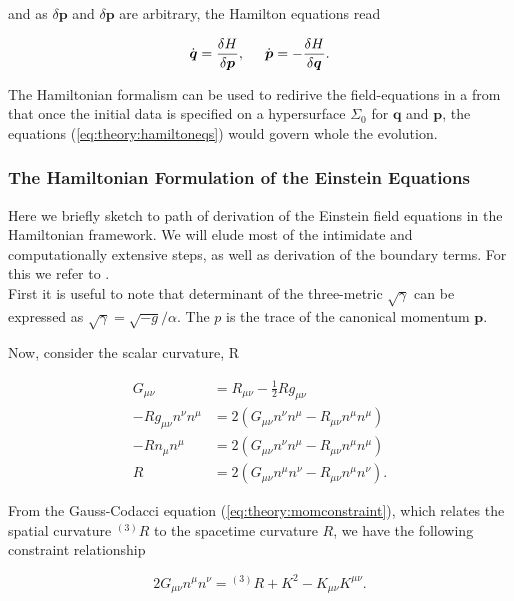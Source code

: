 \documentclass[11pt,a4paper,headinclude=true,DIV=14,BCOR=8mm,chapterprefix,listof=totoc,twoside,openright,abstracton]{scrbook}
\begin{document}
and as $\delta\boldsymbol{p}$ and $\delta\boldsymbol{p}$ are arbitrary, the Hamilton equations read

\begin{equation}
    \dot{\boldsymbol{q}}=\frac{\delta H}{\delta\boldsymbol{p}}, \hspace{5mm} \dot{\boldsymbol{p}} = -\frac{\delta H}{\delta\boldsymbol{q}}.
    \label{eq:theory:hamiltoneqs}
\end{equation}

The Hamiltonian formalism can be used to redirive the field-equations in a from that once the initial data is specified on a hypersurface $\Sigma_0$ for $\boldsymbol{q}$ and $\boldsymbol{p}$, the equations (\ref{eq:theory:hamiltoneqs}) would govern whole the evolution.

\subsubsection{The Hamiltonian Formulation of the Einstein Equations}

Here we briefly sketch to path of derivation of the Einstein field equations in the Hamiltonian framework. We will elude most of the intimidate and computationally extensive steps, as well as derivation of the boundary terms. For this we refer to \cite{Poisson:2004}.\\
First it is useful to note that determinant of the three-metric $\sqrt{\gamma}$ can be expressed as $\sqrt{\gamma}=\sqrt{-g}/\alpha$. The $p$ is the trace of the canonical momentum $\boldsymbol{p}$.

Now, consider the scalar curvature, R

\begin{align}
    G_{\mu\nu} &= R_{\mu\nu} - \frac{1}{2}Rg_{\mu\nu} \\
    -Rg_{\mu\nu}n^{\nu}n^{\mu} &= 2(G_{\mu\nu} n^{\nu}n^{\mu}-R_{\mu\nu}n^{\mu}n^{\mu})\\
    -Rn_{\mu}n^{\mu}& = 2(G_{\mu\nu}n^{\nu}n^{\mu} - R_{\mu\nu}n^{\mu}n^{\mu}) \\
    R &= 2(G_{\mu\nu}n^{\mu}n^{\nu} - R_{\mu\nu}n^{\mu}n^{\nu}).
\end{align}

From the Gauss-Codacci equation (\ref{eq:theory:momconstraint}), which relates the spatial curvature $^{(3)}R$ to the spacetime curvature $R$, we have the following constraint
relationship

\begin{equation}
    2G_{\mu\nu}n^{\mu}n^{\nu} = {^{(3)}R} + K^2 - K_{\mu\nu}K^{\mu\nu}.
\end{equation}
\end{document}
